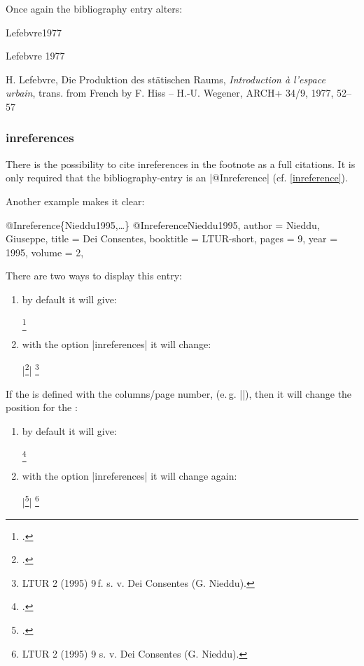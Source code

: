 \documentclass[a4paper,
10pt,
greek,
french,
spanish,
italian,
ngerman,
english
]{ltxdoc}
\begin{document}
Once again the bibliography entry alters:

\begin{bibbox}{Lefebvre1977}\footnotesize
\parbox[t]{2cm}{Lefebvre 1977} \parbox[t]{9cm}{H. Lefebvre, 
Die Produktion des stätischen Raums, \emph{Introduction à l’espace urbain}, 
{\color{red} trans. from French by F. Hiss -- H.-U. Wegener}, ARCH+ 34/9, 1977, 52–57}
\end{bibbox}

\subsubsection{inreferences}\label{inreferences}
There is the possibility to cite inreferences in the footnote as a full citations.
It is only required that the bibliography-entry is an |@Inreference|  (cf. \cref{inreference}).
 
Another example makes it clear: 
\begin{bibexample}[label=Nieddu1995]{{@}Inreference\{Nieddu1995,…\}}
@Inreference{Nieddu1995,
  author    = {Nieddu, Giuseppe},
  title     = {Dei Consentes},
  booktitle = LTUR-short,
  pages     = {9\psq},
  year      = {1995},
  volume    = {2},
}
\end{bibexample}

There are two ways to display this entry:
 \begin{enumerate}
 \item by default it will give:  
 \begin{example}
\footnote{\cite{Nieddu1995}.}
 \end{example}
 \item with the option |inreferences| it will change:
 \begin{tcolorbox}[examplebox]
 |\footnote{\cite{Nieddu1995}.}|
 \tcblower
\footnote{LTUR 2 (1995) 9\,f. s. v. Dei Consentes (G. Nieddu).}
 \end{tcolorbox}
  \end{enumerate}

If the  is defined with the columns/page number, (e.\,g. |\cite[9]{Nieddu1995}|), 
then it will change the position for the :
\begin{enumerate} 
 \item by default it will give: 
 \begin{example}
\footnote{\cite[9]{Nieddu1995}.}
 \end{example}
 \item with the option |inreferences| it will change again:
  \begin{tcolorbox}[examplebox]
|\footnote{\cite[9]{Nieddu1995}.}|
 \tcblower
\footnote{LTUR 2 (1995) 9 s. v. Dei Consentes (G. Nieddu).}
 \end{tcolorbox}
  \end{enumerate}
\end{document}
